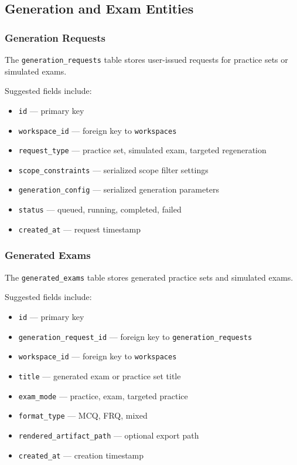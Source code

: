 \documentclass[11pt]{article}
\begin{document}
\subsection{Generation and Exam Entities}

\subsubsection{Generation Requests}
The \texttt{generation\_requests} table stores user-issued requests for practice sets or simulated exams.

Suggested fields include:
\begin{itemize}
\item \texttt{id} --- primary key
\item \texttt{workspace\_id} --- foreign key to \texttt{workspaces}
\item \texttt{request\_type} --- practice set, simulated exam, targeted regeneration
\item \texttt{scope\_constraints} --- serialized scope filter settings
\item \texttt{generation\_config} --- serialized generation parameters
\item \texttt{status} --- queued, running, completed, failed
\item \texttt{created\_at} --- request timestamp
\end{itemize}

\subsubsection{Generated Exams}
The \texttt{generated\_exams} table stores generated practice sets and simulated exams.

Suggested fields include:
\begin{itemize}
\item \texttt{id} --- primary key
\item \texttt{generation\_request\_id} --- foreign key to \texttt{generation\_requests}
\item \texttt{workspace\_id} --- foreign key to \texttt{workspaces}
\item \texttt{title} --- generated exam or practice set title
\item \texttt{exam\_mode} --- practice, exam, targeted practice
\item \texttt{format\_type} --- MCQ, FRQ, mixed
\item \texttt{rendered\_artifact\_path} --- optional export path
\item \texttt{created\_at} --- creation timestamp
\end{itemize}
\end{document}
